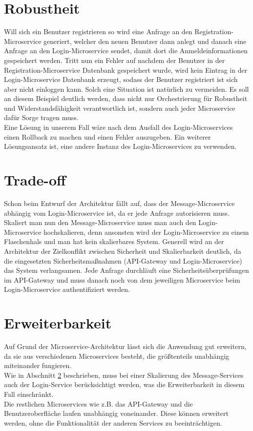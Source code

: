  \section{Robustheit}
 Will sich ein Benutzer registrieren so wird eine Anfrage an den Registration-Microservice generiert, welcher den neuen Benutzer dann anlegt und danach eine Anfrage an den Login-Microservice sendet, damit dort die Anmeldeinformationen gespeichert werden. Tritt nun ein Fehler auf nachdem der Benutzer in der Registration-Microservice Datenbank gespeichert wurde, wird kein Eintrag in der Login-Microservice Datenbank erzeugt, sodass der Benutzer registriert ist sich aber nicht einloggen kann. Solch eine Situation ist natürlich zu vermeiden. Es soll an diesem Beispiel deutlich werden, dass nicht nur Orchestrierung für Robustheit und Widerstandsfähigkeit verantwortlich ist, sondern auch jeder Microservice dafür Sorge tragen muss.\\
 Eine Lösung in unserem Fall wäre nach dem Ausfall des Login-Microservices einen Rollback zu machen und einen Fehler auszugeben. Ein weiterer Lösungsansatz ist, eine andere Instanz des Login-Microservices zu verwenden.
 
\section{Trade-off}
\label{tradeoff}
Schon beim Entwurf der Architektur fällt auf, dass der Message-Microservice abhängig vom Login-Microservice ist, da er jede Anfrage autorisieren muss. Skaliert man nun den Message-Microservice muss man auch den Login-Microservice hochskalieren, denn ansonsten wird der Login-Microservice zu einem Flaschenhals und man hat kein skalierbares System. Generell wird an der Architektur der Zielkonflikt zwischen Sicherheit und Skalierbarkeit deutlich, da die eingesetzten Sicherheitsmaßnahmen (API-Gateway und Login-Microservice) das System verlangsamen. Jede Anfrage durchläuft eine Sicherheitsüberprüfungen im API-Gateway und muss danach noch von dem jeweiligen Microservice beim Login-Microservice authentifiziert werden.


\section{Erweiterbarkeit}
Auf Grund der Microservice-Architektur lässt sich die Anwendung gut erweitern, da sie aus verschiedenen Microservices besteht, die größtenteils unabhängig miteinander fungieren.\\
Wie in Abschnitt \ref{tradeoff} beschrieben, muss bei einer Skalierung des Message-Services auch der Login-Service berücksichtigt werden, was die Erweiterbarkeit in diesem Fall einschränkt.\\
Die restlichen Microservices wie z.B. das API-Gateway und die Benutzeroberfläche laufen unabhängig voneinander. Diese können erweitert werden, ohne die Funktionalität der anderen Services zu beeinträchtigen.
